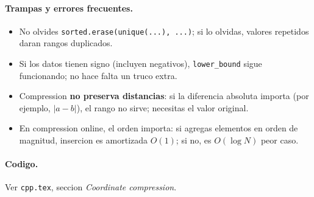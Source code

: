 \paragraph{Trampas y errores frecuentes.}
\begin{itemize}\setlength\itemsep{0pt}
	\item No olvides \texttt{sorted.erase(unique(...), ...)}; si lo olvidas, valores repetidos daran rangos duplicados.
	\item Si los datos tienen signo (incluyen negativos), \texttt{lower\_bound} sigue funcionando; no hace falta un truco extra.
	\item Compression \textbf{no preserva distancias}: si la diferencia absoluta importa (por ejemplo, $|a - b|$), el rango no sirve; necesitas el valor original.
	\item En compression online, el orden importa: si agregas elementos en orden de magnitud, insercion es amortizada $O(1)$; si no, es $O(\log N)$ peor caso.
\end{itemize}

\paragraph{Codigo.}
Ver \texttt{cpp.tex}, seccion \textit{Coordinate compression}.
